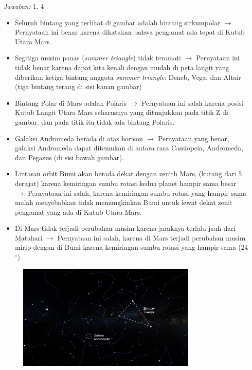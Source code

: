 \documentclass[11pt,fleqn]{exam}
\newcommand*{\de}{\ensuremath{^{\circ}}}
\begin{document}
\begin{questions}
\bigskip
\textit{Jawaban: } 1, 4

\begin{itemize}
    \item Seluruh bintang yang terlihat di gambar adalah bintang sirkumpolar $\rightarrow$ Pernyataan ini benar karena dikatakan bahwa pengamat ada tepat di Kutub Utara Mars.
    \item Segitiga musim panas (\textit{summer triangle}) tidak teramati $\rightarrow$ Pernyataan ini tidak benar karena dapat kita kenali dengan mudah di peta langit yang diberikan ketiga bintang anggota \textit{summer triangle}: Deneb, Vega, dan Altair (tiga bintang terang di sisi kanan gambar)
    \item Bintang Polar di Mars adalah Polaris $\rightarrow$ Pernyataan ini salah karena posisi Kutub Langit Utara Mars seharusnya yang ditunjukkan pada titik Z di gambar, dan pada titik itu tidak ada bintang Polaris.
    \item Galaksi Andromeda berada di atas horison $\rightarrow$ Pernyataan yang benar, galaksi Andromeda dapat ditemukan di antara rasa Cassiopeia, Andromeda, dan Pegasus (di sisi bawah gambar).
    \item Lintasan orbit Bumi akan berada dekat dengan zenith Mars, (kurang dari 5 derajat) karena kemiringan sumbu rotasi kedua planet hampir sama besar $\rightarrow$ Pernyataan ini salah, karena kemiringan sumbu rotasi yang hampir sama malah menyebabkan tidak memungkinkan Bumi untuk lewat dekat zenit pengamat yang ada di Kutub Utara Mars.
    \item Di Mars tidak terjadi perubahan musim karena jaraknya terlalu jauh dari Matahari $\rightarrow$ Pernyataan ini salah, karena di Mars terjadi perubahan musim mirip dengan di Bumi karena kemiringan sumbu rotasi yang hampir sama (24\de)
\end{itemize}
\begin{figure}[H]
\centering
\includegraphics[width=0.8\textwidth]{osp2022_23_jawab.png}
\label{fig:osp2022_23_jawab}
\end{figure}


\end{questions}
\end{document}
